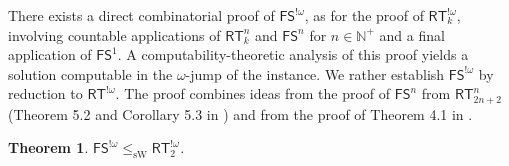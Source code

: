 \documentclass{article}
\newcommand{\FS}[0]{\mathsf{FS}}
\newcommand{\RT}[0]{\mathsf{RT}}
\newcommand{\NN}[0]{\mathbb{N}}
\newcommand{\sW}{\mathrm{sW}}
\newtheorem{theorem}{Theorem}
\numberwithin{theorem}{section}
\newcommand{\ludovic}[1]{\textcolor{blue}{#1}}
\begin{document}
There exists a direct combinatorial proof of $\FS^{!\omega}$, as for the proof of $\RT^{!\omega}_k$, involving countable applications of $\RT^n_k$ and $\FS^n$ for $n \in \NN^+$ and a final application of $\FS^1$. 
A computability-theoretic analysis of this proof yields a solution computable in the $\omega$-jump of the instance.
We rather establish $\FS^{!\omega}$ by reduction to $\RT^{!\omega}$. The proof combines ideas from the proof of $\FS^n$ from $\RT^n_{2n+2}$ (Theorem 5.2 and Corollary 5.3 in \cite{Cholak_Giusto_Hirst_Jockusch_2005}) and from the proof of Theorem 4.1 in \cite{carlucci2014strength}.

\begin{theorem}\label{thm:fs_red_rt}
    $\FS^{!\omega} \leq_{\sW} \RT^{!\omega}_2$.
\end{theorem}
\end{document}
